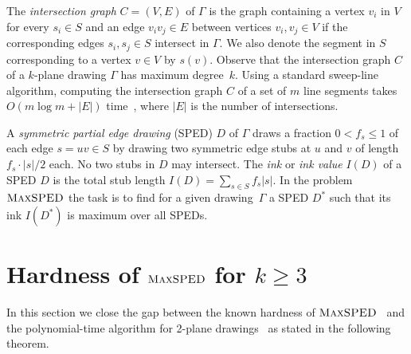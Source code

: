 \documentclass[a4paper,english,numberwithinsect]{eurocg18}
\newcommand{\martin}[1]{\todo[inline,color=blue!40]{MN: #1}}
\newcommand{\fabian}[1]{\todo[inline,color=pink!40]{FK: #1}}
\newcommand{\ped}{\ensuremath{\textsc{PED}}\xspace}
\newcommand{\maxsped}{\ensuremath{\textsc{MaxSPED}}\xspace}
\begin{document}
The \emph{intersection graph} $ C = (V,E) $ of $ \Gamma $ is the graph containing a vertex $v_i$ in $ V $ for every $ s_i \in S $ and an edge $ v_i v_j \in E $ between vertices $ v_i, v_j \in V $ if the corresponding edges $ s_i, s_j \in S $ intersect in $ \Gamma $. 
We also denote the segment in $S$ corresponding to a vertex $v \in V$ by $s(v)$.
Observe that the intersection graph $ C $ of a $ k $-plane drawing $ \Gamma $ has maximum degree~$ k $.  
%
Using a standard sweep-line algorithm, computing the intersection graph $C$ of a set of $m$ line segments takes $O(m \log m + |E|)$ time~\cite{bcko-cgaa-08}, where $|E|$ is  the number of intersections.

A \emph{symmetric partial edge drawing} (SPED) $D$ of $\Gamma$ draws a fraction $0 < f_s \le 1$ of each edge $s = uv \in S$ by drawing two symmetric edge stubs at $u$ and $v$ of length $f_s \cdot |s|/2$ each. 
No two stubs in $D$ may intersect.
The \emph{ink} or \emph{ink value}  $I(D)$ of a SPED $D$ is the total stub length $I(D) = \sum_{s \in S} f_s |s|$.
In the problem \maxsped the task is to find for a given drawing~$\Gamma$ a SPED $D^*$ such that its ink $I(D^*)$ is maximum over all SPEDs.

 

%
%

\section{Hardness of \maxsped for $k\ge3$}\label{sec:hardness}

In this section we close the gap between the known hardness of \maxsped~\cite{b-sgh-15} and the polynomial-time algorithm for 2-plane drawings~\cite{bcgkmn-pped-17} as stated in the following theorem.
\end{document}
